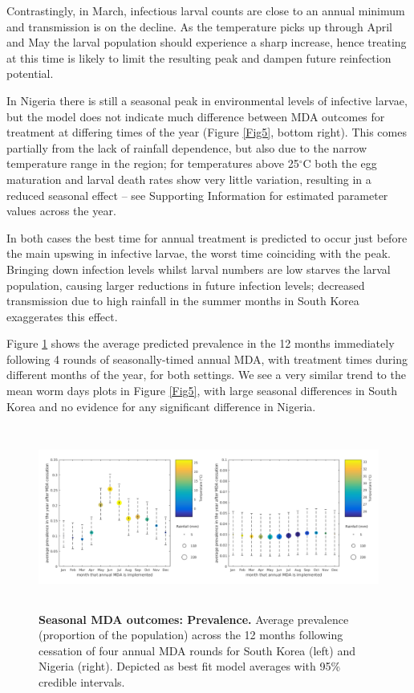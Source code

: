 Contrastingly, in March, infectious larval counts are close to an annual minimum and transmission is on the decline. As the temperature picks up through April and May the larval population should experience a sharp increase, hence treating at this time is likely to limit the resulting peak and dampen future reinfection potential. 

In Nigeria there is still a seasonal peak in environmental levels of infective larvae, but the model does not indicate much difference between MDA outcomes for treatment at differing times of the year (Figure \ref{Fig5}, bottom right). This comes partially from the lack of rainfall dependence, but also due to the narrow temperature range in the region; for temperatures above 25$^{\circ}$C both the egg maturation and larval death rates show very little variation, resulting in a reduced seasonal effect -- see Supporting Information for estimated parameter values across the year.

In both cases the best time for annual treatment is predicted to occur just before the main upswing in infective larvae, the worst time coinciding with the peak. Bringing down infection levels whilst larval numbers are low starves the larval population, causing larger reductions in future infection levels; decreased transmission due to high rainfall in the summer months in South Korea exaggerates this effect.

Figure \ref{Fig8} shows the average predicted prevalence in the 12 months immediately following 4 rounds of seasonally-timed annual MDA, with treatment times during different months of the year, for both settings. We see a very similar trend to the mean worm days plots in Figure \ref{Fig5}, with large seasonal differences in South Korea and no evidence for any significant difference in Nigeria.

\begin{figure}[ht]
\includegraphics[height=6.0cm]{Project/Figures/STH/Fig8.pdf}
\caption[Resulting prevalence by MDA timing.]{{\bf Seasonal MDA outcomes: Prevalence.}
Average prevalence (proportion of the population) across the 12 months following cessation of four annual MDA rounds for South Korea (left) and Nigeria (right). Depicted as best fit model averages with 95\% credible intervals.}
\label{Fig8}
\end{figure} 

